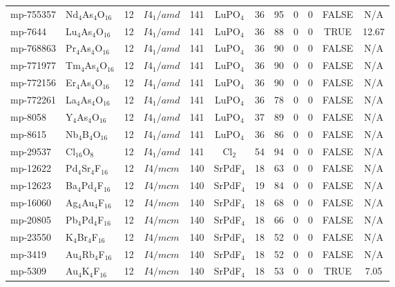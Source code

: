 {\begin{longtable}{llcccccccccc}
    mp-755357 & Nd$_{4}$As$_{4}$O$_{16}$ & 12    & $I4_1/amd$ & 141   & LuPO$_{4}$ & 36    & 95    & 0     & 0     & FALSE & N/A \\
    mp-7644 & Lu$_{4}$As$_{4}$O$_{16}$ & 12    & $I4_1/amd$ & 141   & LuPO$_{4}$ & 36    & 88    & 0     & 0     & TRUE  & 12.67  \\
    mp-768863 & Pr$_{4}$As$_{4}$O$_{16}$ & 12    & $I4_1/amd$ & 141   & LuPO$_{4}$ & 36    & 90    & 0     & 0     & FALSE & N/A \\
    mp-771977 & Tm$_{4}$As$_{4}$O$_{16}$ & 12    & $I4_1/amd$ & 141   & LuPO$_{4}$ & 36    & 90    & 0     & 0     & FALSE & N/A \\
    mp-772156 & Er$_{4}$As$_{4}$O$_{16}$ & 12    & $I4_1/amd$ & 141   & LuPO$_{4}$ & 36    & 90    & 0     & 0     & FALSE & N/A \\
    mp-772261 & La$_{4}$As$_{4}$O$_{16}$ & 12    & $I4_1/amd$ & 141   & LuPO$_{4}$ & 36    & 78    & 0     & 0     & FALSE & N/A \\
    mp-8058 & Y$_{4}$As$_{4}$O$_{16}$ & 12    & $I4_1/amd$ & 141   & LuPO$_{4}$ & 37    & 89    & 0     & 0     & FALSE & N/A \\
    mp-8615 & Nb$_{4}$B$_{4}$O$_{16}$ & 12    & $I4_1/amd$ & 141   & LuPO$_{4}$ & 36    & 86    & 0     & 0     & FALSE & N/A \\
    mp-29537 & Cl$_{16}$O$_{8}$ & 12    & $I4_1/amd$ & 141   & Cl$_{2}$ & 54    & 94    & 0     & 0     & FALSE & N/A \\
    mp-12622 & Pd$_{4}$Sr$_{4}$F$_{16}$ & 12    & $I4/mcm$ & 140   & SrPdF$_{4}$ & 18    & 63    & 0     & 0     & FALSE & N/A \\
    mp-12623 & Ba$_{4}$Pd$_{4}$F$_{16}$ & 12    & $I4/mcm$ & 140   & SrPdF$_{4}$ & 19    & 84    & 0     & 0     & FALSE & N/A \\
    mp-16060 & Ag$_{4}$Au$_{4}$F$_{16}$ & 12    & $I4/mcm$ & 140   & SrPdF$_{4}$ & 18    & 68    & 0     & 0     & FALSE & N/A \\
    mp-20805 & Pb$_{4}$Pd$_{4}$F$_{16}$ & 12    & $I4/mcm$ & 140   & SrPdF$_{4}$ & 18    & 66    & 0     & 0     & FALSE & N/A \\
    mp-23550 & K$_{4}$Br$_{4}$F$_{16}$ & 12    & $I4/mcm$ & 140   & SrPdF$_{4}$ & 18    & 52    & 0     & 0     & FALSE & N/A \\
    mp-3419 & Au$_{4}$Rb$_{4}$F$_{16}$ & 12    & $I4/mcm$ & 140   & SrPdF$_{4}$ & 18    & 52    & 0     & 0     & FALSE & N/A \\
    mp-5309 & Au$_{4}$K$_{4}$F$_{16}$ & 12    & $I4/mcm$ & 140   & SrPdF$_{4}$ & 18    & 53    & 0     & 0     & TRUE  & 7.05  \\

\end{longtable}}

